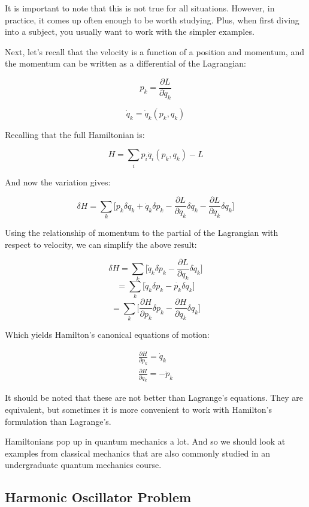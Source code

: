 \documentclass{article}
\begin{document}
It is important to note that this is not true for all situations.  However, in practice, it comes up often enough to be worth studying.  Plus, when first diving into a subject, you usually want to work with the simpler examples.

Next, let's recall that the velocity is a function of a position and momentum, and the momentum can be written as a differential of the Lagrangian:

$$p_k = \frac{ \partial L }{ \partial \dot{ q }_k }$$

$$\dot{ q }_k = \dot{ q }_k( p_k, q_k )$$

Recalling that the full Hamiltonian is:

$$H = \sum_i p_i \dot{ q }_i( p_k, q_k ) - L$$

And now the variation gives:

$$\delta H = \sum_k \big[ p_k \delta \dot{ q }_k + \dot{ q }_k \delta p_k - \frac{ \partial L }{ \partial \dot{ q }_k } \delta \dot{ q }_k - \frac{ \partial L }{ \partial q_k } \delta q_k \big]$$

Using the relationship of momentum to the partial of the Lagrangian with respect to velocity, we can simplify the above result:

$$\delta H = \sum_k \big[ \dot{ q }_k \delta p_k - \frac{ \partial L }{ \partial q_k } \delta q_k \big]$$
$$ = \sum_k \big[ \dot{ q }_k \delta p_k - \dot{ p_k } \delta q_k \big]$$
$$ = \sum_k \big[ \frac{ \partial H }{ \partial p_k } \delta p_k - \frac{ \partial H }{ \partial q_k } \delta q_k \big]$$

Which yields Hamilton's canonical equations of motion:

\begin{align}
\frac{ \partial H }{ \partial p_k } = \dot{ q }_k\\
\frac{ \partial H }{ \partial q_k } = -\dot{ p }_k
\end{align}

It should be noted that these are not better than Lagrange's equations.  They are equivalent, but sometimes it is more convenient to work with Hamilton's formulation than Lagrange's.

Hamiltonians pop up in quantum mechanics a lot.  And so we should look at examples from classical mechanics that are also commonly studied in an undergraduate quantum mechanics course.

%
%
%
\subsection{Harmonic Oscillator Problem}
\end{document}
